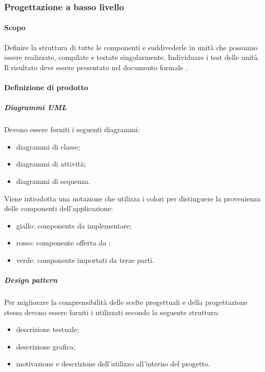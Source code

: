             \subsubsection{Progettazione a basso livello}
                \paragraph{Scopo}
                Definire la struttura di tutte le componenti e suddivederle in unità che possanno essere realizzate, compilate e testate singolarmente. Individuare i test delle unità. Il risultato deve essere presentato nel documento formale \ddp.
                \paragraph{Definizione di prodotto}
                \subparagraph{Diagrammi UML}
                Devono essere forniti i seguenti diagrammi:
                \begin{itemize}
                    \item diagrammi di classe;
                    \item diagrammi di attività;
                    \item diagrammi di sequenza.
                \end{itemize}
	            Viene introdotta una notazione che utilizza i colori per distinguere la provenienza delle componenti dell'applicazione:
	            \begin{itemize}
	            	\item giallo: componente da implementare;
	            	\item rosso: componente offerta da \riskapp;
	            	\item verde: componente importati da terze parti.
	            \end{itemize}
	            \subparagraph{Design pattern}
	            Per migliorare la comprensibilità delle scelte progettuali e della progettazione stessa devono essere forniti i  utilizzati secondo la seguente struttura:
	            \begin{itemize}
	            	\item descrizione testuale;
	            	\item descrizione grafica;
	            	\item motivazione e descrizione dell'utilizzo all'interno del progetto.
	            \end{itemize}
